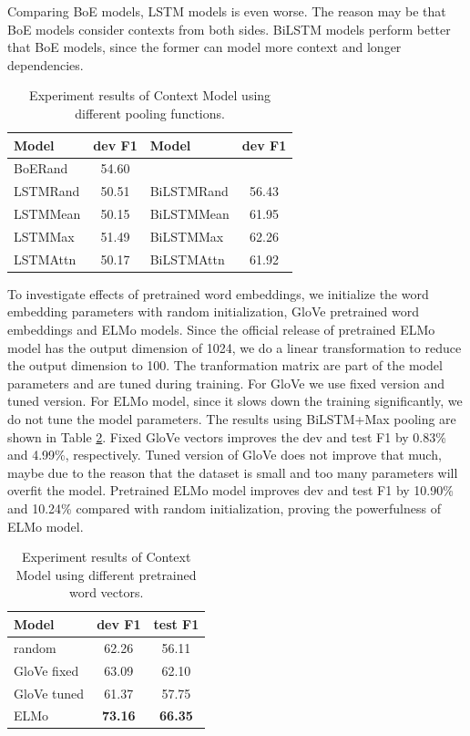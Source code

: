 \documentclass[letterpaper]{article} %
\begin{document}
Comparing BoE models, LSTM models is even worse. The reason may be that BoE models consider contexts from both sides. BiLSTM models perform better that BoE models, since the former can model more context and longer dependencies.

\begin{table}[t!]
\centering
\begin{tabular}{l c | l c}
\hline 
{\bf Model} & {\bf dev F1 } & {\bf Model} & {\bf dev F1} \\ 
\hline\hline
BoERand & 54.60 && \\
\hline
LSTMRand & 50.51 & BiLSTMRand & 56.43 \\
LSTMMean & 50.15 & BiLSTMMean & 61.95 \\
LSTMMax & 51.49 & BiLSTMMax  & 62.26 \\
LSTMAttn & 50.17 & BiLSTMAttn & 61.92 \\ 
\hline
\end{tabular}
\caption{Experiment results of Context Model using different pooling functions.}
\label{table:contextresult}
\end{table}

To investigate effects of pretrained word embeddings, we initialize the word embedding parameters with random initialization, GloVe pretrained word embeddings and ELMo models. Since the official release of pretrained ELMo model has the output dimension of 1024, we do a linear transformation to reduce the output dimension to 100. The tranformation matrix are part of the model parameters and are tuned during training. For GloVe we use fixed version and tuned version. For ELMo model, since it slows down the training significantly, we do not tune the model parameters. The results using BiLSTM+Max pooling are shown in Table \ref{table:pretrain}. Fixed GloVe vectors improves the dev and test F1 by 0.83\% and 4.99\%, respectively. Tuned version of GloVe does not improve that much, maybe due to the reason that the dataset is small and too many parameters will overfit the model. Pretrained ELMo model improves dev and test F1 by 10.90\% and 10.24\% compared with random initialization, proving the powerfulness of ELMo model.

\begin{table}[t]
\centering
\begin{tabular}{l c c} 
\hline
{\bf Model}  & {\bf dev F1 } & {\bf test F1 } \\
\hline\hline
random  &  62.26  & 56.11 \\ 
GloVe fixed  & 63.09  & 62.10 \\
GloVe tuned  & 61.37  & 57.75  \\
ELMo  & {\bf 73.16} & {\bf 66.35} \\
\hline
\end{tabular}
\caption{Experiment results of Context Model using different pretrained word vectors.}
\label{table:pretrain}
\end{table}
\end{document}
